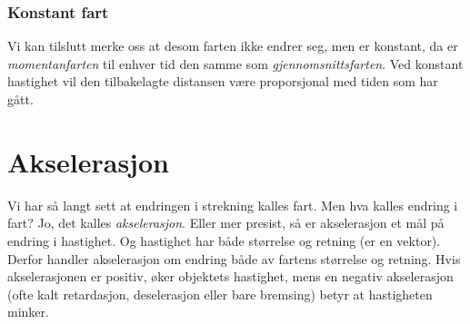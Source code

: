 

\subsubsection{Konstant fart}
 Vi kan tilslutt merke oss at desom farten ikke endrer seg, men er konstant, da er \textit{momentanfarten} til enhver tid den samme som \textit{gjennomsnittsfarten}. Ved konstant hastighet vil den tilbakelagte distansen være proporsjonal med tiden som har gått.







\section{Akselerasjon}
Vi har så langt sett at endringen i strekning kalles fart. Men hva kalles endring i fart? Jo, det kalles \textit{akselerasjon}. Eller mer presist, så er akselerasjon et mål på endring i hastighet. Og hastighet har både størrelse og retning (er en vektor). Derfor handler akselerasjon om endring både av fartens størrelse og retning. Hvis akselerasjonen er positiv, øker objektets hastighet, mens en negativ akselerasjon (ofte kalt retardasjon, deselerasjon eller bare bremsing) betyr at hastigheten minker.



